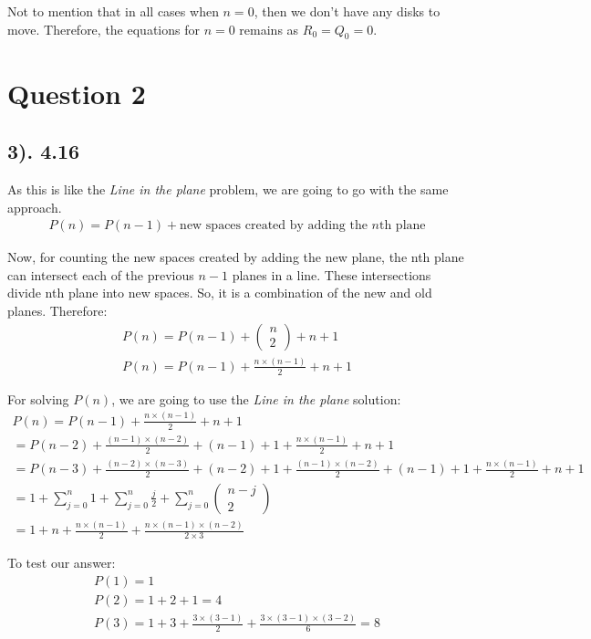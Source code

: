 \documentclass[12pt]{article}
\begin{document}
Not to mention that in all cases when $n=0$, then we don't have any disks to move. Therefore, the equations for $n=0$ remains as $R_{0}=Q_{0}=0$.

\section*{Question 2}
\subsection*{3). 4.16}
As this is like the \textit{Line in the plane} problem, we are going to go with the same approach.
\begin{gather*}
    P(n) = P(n-1) + \text{new spaces created by adding the $n$th plane}
\end{gather*}

Now, for counting the new spaces created by adding the new plane, the nth plane can intersect each of the previous $n-1$ planes in a line.
These intersections divide nth plane into new spaces. So, it is a combination of the new and old planes. Therefore:
\begin{gather*}
    P(n) = P(n-1) + \begin{pmatrix} n \\ 2 \end{pmatrix} + n + 1 \\
    P(n) = P(n-1) + \frac{n \times (n-1)}{2} + n + 1
\end{gather*}

For solving $P(n)$, we are going to use the \textit{Line in the plane} solution:
\begin{gather*}
    P(n) = P(n-1) + \frac{n \times (n-1)}{2} + n + 1 \\
    = P(n-2) + \frac{(n-1) \times (n-2)}{2} + (n-1) + 1 + \frac{n \times (n-1)}{2} + n + 1  \\
    = P(n-3) + \frac{(n-2) \times (n-3)}{2} + (n-2) + 1 + \frac{(n-1) \times (n-2)}{2} + (n-1) + 1 + \frac{n \times (n-1)}{2} + n + 1  \\
    = 1 + \sum_{j=0}^n 1 + \sum_{j=0}^n \frac{j}{2} + \sum_{j=0}^n \begin{pmatrix} n-j \\ 2 \end{pmatrix} \\
    = 1 + n + \frac{n \times (n-1)}{2} + \frac{n \times (n-1) \times (n-2)}{2 \times 3}
\end{gather*}

To test our answer:
\begin{gather*}
    P(1) = 1 \\
    P(2) = 1 + 2 + 1 = 4 \\
    P(3) = 1 + 3 + \frac{3 \times (3-1)}{2} + \frac{3 \times (3-1) \times (3-2)}{6} = 8
\end{gather*}
\end{document}
